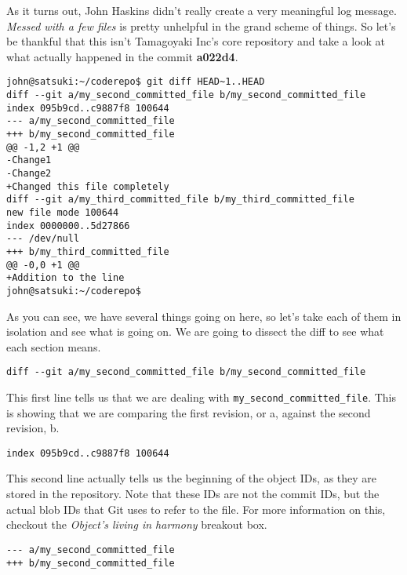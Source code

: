 As it turns out, John Haskins didn't really create a very meaningful log message.  \emph{Messed with a few files} is pretty unhelpful in the grand scheme of things.  So let's be thankful that this isn't Tamagoyaki Inc's core repository and take a look at what actually happened in the commit \textbf{a022d4}.

\begin{Verbatim}[frame=leftline,framerule=1mm,fontsize=\relsize{-3}] 
john@satsuki:~/coderepo$ git diff HEAD~1..HEAD
diff --git a/my_second_committed_file b/my_second_committed_file
index 095b9cd..c9887f8 100644
--- a/my_second_committed_file
+++ b/my_second_committed_file
@@ -1,2 +1 @@
-Change1
-Change2
+Changed this file completely
diff --git a/my_third_committed_file b/my_third_committed_file
new file mode 100644
index 0000000..5d27866
--- /dev/null
+++ b/my_third_committed_file
@@ -0,0 +1 @@
+Addition to the line
john@satsuki:~/coderepo$ 
\end{Verbatim}

As you can see, we have several things going on here, so let's take each of them in isolation and see what is going on.  We are going to dissect the diff to see what each section means.

\begin{Verbatim}[frame=leftline,framerule=1mm,fontsize=\relsize{-3}] 
diff --git a/my_second_committed_file b/my_second_committed_file
\end{Verbatim}

This first line tells us that we are dealing with \newline\texttt{my\_second\_committed\_file}.  This is showing that we are comparing the first revision, or a, against the second revision, b.

\begin{Verbatim}[frame=leftline,framerule=1mm,fontsize=\relsize{-3}] 
index 095b9cd..c9887f8 100644
\end{Verbatim}

This second line actually tells us the beginning of the object IDs, as they are stored in the repository.  Note that these IDs are not the commit IDs, but the actual blob IDs that Git uses to refer to the file.  For more information on this, checkout the \emph{Object's living in harmony} breakout box.

\begin{Verbatim}[frame=leftline,framerule=1mm,fontsize=\relsize{-3}] 
--- a/my_second_committed_file
+++ b/my_second_committed_file
\end{Verbatim}

